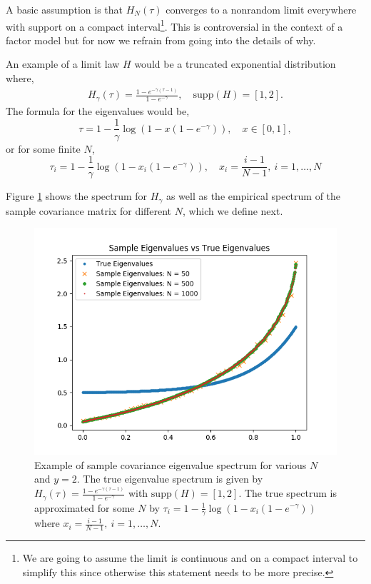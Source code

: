 \documentclass{article}
\begin{document}
A basic assumption is that $H_N(\tau)$ converges to a nonrandom limit everywhere
with support on a compact interval\footnote{We are going to assume the limit is
continuous and on a compact interval to simplify this since otherwise this
statement needs to be more precise.}.  This is controversial in the context of 
a factor model but for now we refrain from going into the details of why.

An example of a limit law $H$ would be a truncated exponential distribution
where,
\begin{gather}\label{eq:H_gamma}
	H_\gamma(\tau) = \frac{1 - e^{-\gamma(\tau - 1)}}{1 - e^{-\gamma}}, 
		\quad \mathrm{supp}(H) = [1, 2].
\end{gather}
The formula for the eigenvalues would be,
\begin{equation}\label{eq:tau}
	\tau = 1 - \frac1\gamma \log\left( 1 - x(1-e^{-\gamma}) \right),
	\quad x \in [0, 1],
\end{equation}
or for some finite $N$,
\begin{equation}\label{eq:tau_i}
	\tau_i = 1 - \frac1\gamma \log\left( 1 - x_i(1-e^{-\gamma}) \right),
	\quad x_i = \frac{i - 1}{N - 1},\ i = 1, \ldots, N
\end{equation}

Figure \ref{fig:eigs} shows the spectrum for $H_\gamma$ as well as the empirical
spectrum of the sample covariance matrix for different $N$, which we define
next.

\begin{figure}[htbp]
	\centering
	\includegraphics[width=5in]{eigs.png}
	\caption{
		Example of sample covariance eigenvalue spectrum for various $N$ and $y=2$.
		The true eigenvalue spectrum is given by $H_\gamma(\tau) = \frac{1 -
		e^{-\gamma(\tau - 1)}}{1 - e^{-\gamma}}$ with $\mathrm{supp}(H) = [1, 2]$.
		The true spectrum is approximated for some $N$ by $\tau_i = 1 - \frac1\gamma
		\log\left( 1 - x_i(1-e^{-\gamma}) \right)$ where $x_i = \frac{i - 1}{N - 1},\
		i = 1, \ldots, N$.
	}
	\label{fig:eigs}
\end{figure}
\end{document}
